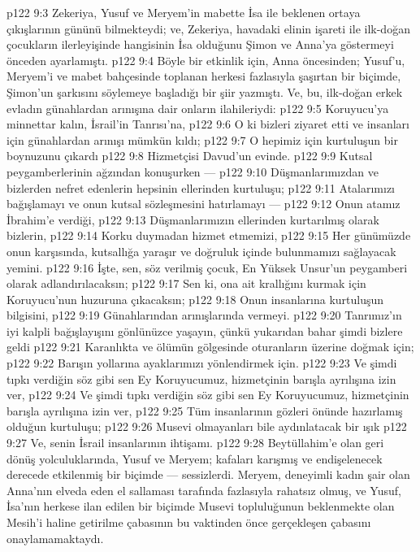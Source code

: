 \vs p122 9:3 Zekeriya, Yusuf ve Meryem’in mabette İsa ile beklenen ortaya çıkışlarının gününü bilmekteydi; ve, Zekeriya, havadaki elinin işareti ile ilk\hyp{}doğan çocukların ilerleyişinde hangisinin İsa olduğunu Şimon ve Anna’ya göstermeyi önceden ayarlamıştı.
\vs p122 9:4 Böyle bir etkinlik için, Anna öncesinden; Yusuf’u, Meryem’i ve mabet bahçesinde toplanan herkesi fazlasıyla şaşırtan bir biçimde, Şimon’un şarkısını söylemeye başladığı bir şiir yazmıştı. Ve, bu, ilk\hyp{}doğan erkek evladın günahlardan arınışına dair onların ilahileriydi:
\vs p122 9:5 Koruyucu’ya minnettar kalın, İsrail’in Tanrısı’na,
\vs p122 9:6 O ki bizleri ziyaret etti ve insanları için günahlardan arınışı mümkün kıldı;
\vs p122 9:7 O hepimiz için kurtuluşun bir boynuzunu çıkardı
\vs p122 9:8 Hizmetçisi Davud’un evinde.
\vs p122 9:9 Kutsal peygamberlerinin ağzından konuşurken ---
\vs p122 9:10 Düşmanlarımızdan ve bizlerden nefret edenlerin hepsinin ellerinden kurtuluşu;
\vs p122 9:11 Atalarımızı bağışlamayı ve onun kutsal sözleşmesini hatırlamayı ---
\vs p122 9:12 Onun atamız İbrahim’e verdiği,
\vs p122 9:13 Düşmanlarımızın ellerinden kurtarılmış olarak bizlerin,
\vs p122 9:14 Korku duymadan hizmet etmemizi,
\vs p122 9:15 Her günümüzde onun karşısında, kutsallığa yaraşır ve doğruluk içinde bulunmamızı sağlayacak yemini.
\vs p122 9:16 İşte, sen, söz verilmiş çocuk, En Yüksek Unsur’un peygamberi olarak adlandırılacaksın;
\vs p122 9:17 Sen ki, ona ait krallığını kurmak için Koruyucu’nun huzuruna çıkacaksın;
\vs p122 9:18 Onun insanlarına kurtuluşun bilgisini,
\vs p122 9:19 Günahlarından arınışlarında vermeyi.
\vs p122 9:20 Tanrımız’ın iyi kalpli bağışlayışını gönlünüzce yaşayın, çünkü yukarıdan bahar şimdi bizlere geldi
\vs p122 9:21 Karanlıkta ve ölümün gölgesinde oturanların üzerine doğmak için;
\vs p122 9:22 Barışın yollarına ayaklarımızı yönlendirmek için.
\vs p122 9:23 Ve şimdi tıpkı verdiğin söz gibi sen Ey Koruyucumuz, hizmetçinin barışla ayrılışına izin ver,
\vs p122 9:24 Ve şimdi tıpkı verdiğin söz gibi sen Ey Koruyucumuz, hizmetçinin barışla ayrılışına izin ver,
\vs p122 9:25 Tüm insanlarının gözleri önünde hazırlamış olduğun kurtuluşu;
\vs p122 9:26 Musevi olmayanları bile aydınlatacak bir ışık
\vs p122 9:27 Ve, senin İsrail insanlarının ihtişamı.
\vs p122 9:28 Beytüllahim’e olan geri dönüş yolculuklarında, Yusuf ve Meryem; kafaları karışmış ve endişelenecek derecede etkilenmiş bir biçimde --- sessizlerdi. Meryem, deneyimli kadın şair olan Anna’nın elveda eden el sallaması tarafında fazlasıyla rahatsız olmuş, ve Yusuf, İsa’nın herkese ilan edilen bir biçimde Musevi topluluğunun beklenmekte olan Mesih’i haline getirilme çabasının bu vaktinden önce gerçekleşen çabasını onaylamamaktaydı.

